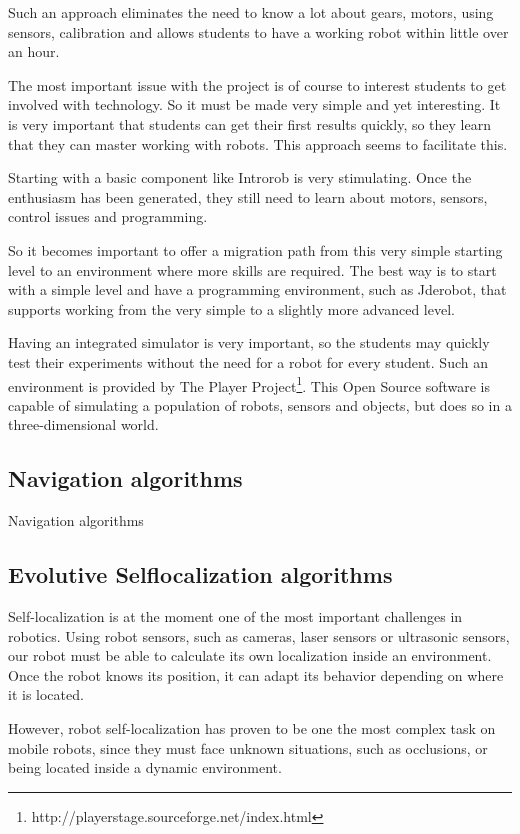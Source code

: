 \documentclass[twocolumn]{svjour3}          %
\begin{document}
Such an approach eliminates the need to know a lot about gears, motors, using sensors, calibration and allows students to have a working robot within little over an hour.

The most important issue with the project is of course to interest students to get involved with technology. So it must be made very simple and yet interesting. It is very important that students can get their first results quickly, so they learn that they can master working with robots. This approach seems to facilitate this.


Starting with a basic component like Introrob is very stimulating. Once the enthusiasm has been generated, they still need to learn about motors, sensors, control issues and programming.

So it becomes important to offer a migration path from this very simple starting level to an environment where more skills are required. The best way is to start with a simple level and have a programming environment, such as Jderobot, that supports working from the very simple to a slightly more advanced level.


Having an integrated simulator is very important, so the students may quickly test their experiments without the need for a robot for every student. Such an environment is provided by The Player Project\footnote{http://playerstage.sourceforge.net/index.html}. This Open Source software is capable of simulating a population of robots, sensors and objects, but does so in a three-dimensional world.


\subsection{Navigation algorithms}
Navigation algorithms

\subsection{Evolutive Selflocalization algorithms}

Self-localization is at the moment one of the most important challenges in robotics. Using robot sensors, such as cameras, laser sensors or ultrasonic sensors, our robot must be able to calculate its own localization inside an environment. Once the robot knows its position, it can adapt its behavior depending on where it is located. 
 
However, robot self-localization has proven to be one the most complex task on mobile robots, since they must face unknown situations, such as occlusions, or being located inside a dynamic environment.
\end{document}

